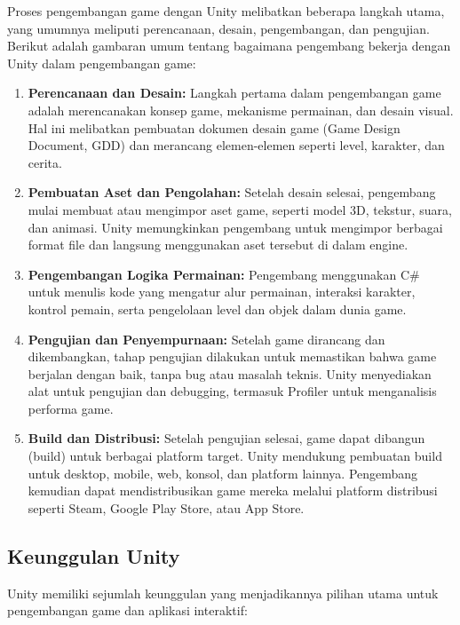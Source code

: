 Proses pengembangan game dengan Unity melibatkan beberapa langkah utama, yang umumnya meliputi perencanaan, desain, pengembangan, dan pengujian. Berikut adalah gambaran umum tentang bagaimana pengembang bekerja dengan Unity dalam pengembangan game:

\begin{enumerate}
    \item \textbf{Perencanaan dan Desain:} Langkah pertama dalam pengembangan game adalah merencanakan konsep game, mekanisme permainan, dan desain visual. Hal ini melibatkan pembuatan dokumen desain game (Game Design Document, GDD) dan merancang elemen-elemen seperti level, karakter, dan cerita.
    \item \textbf{Pembuatan Aset dan Pengolahan:} Setelah desain selesai, pengembang mulai membuat atau mengimpor aset game, seperti model 3D, tekstur, suara, dan animasi. Unity memungkinkan pengembang untuk mengimpor berbagai format file dan langsung menggunakan aset tersebut di dalam engine.
    \item \textbf{Pengembangan Logika Permainan:} Pengembang menggunakan C\# untuk menulis kode yang mengatur alur permainan, interaksi karakter, kontrol pemain, serta pengelolaan level dan objek dalam dunia game.
    \item \textbf{Pengujian dan Penyempurnaan:} Setelah game dirancang dan dikembangkan, tahap pengujian dilakukan untuk memastikan bahwa game berjalan dengan baik, tanpa bug atau masalah teknis. Unity menyediakan alat untuk pengujian dan debugging, termasuk Profiler untuk menganalisis performa game.
    \item \textbf{Build dan Distribusi:} Setelah pengujian selesai, game dapat dibangun (build) untuk berbagai platform target. Unity mendukung pembuatan build untuk desktop, mobile, web, konsol, dan platform lainnya. Pengembang kemudian dapat mendistribusikan game mereka melalui platform distribusi seperti Steam, Google Play Store, atau App Store.
\end{enumerate}

\subsection{Keunggulan Unity}
\label{subsec:keunggulan_unity}

Unity memiliki sejumlah keunggulan yang menjadikannya pilihan utama untuk pengembangan game dan aplikasi interaktif:

